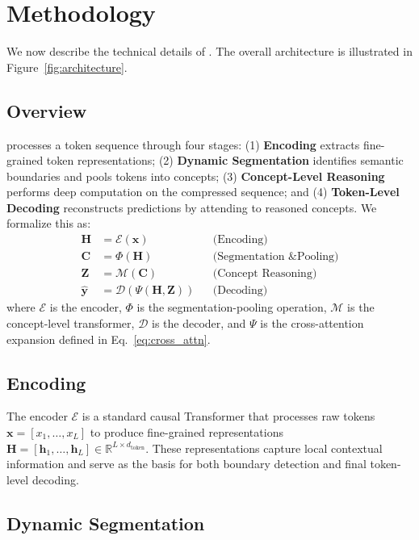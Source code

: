 \section{Methodology}

We now describe the technical details of \ModelName{}. The overall architecture is illustrated in Figure~\ref{fig:architecture}.

\subsection{Overview}

\ModelName{} processes a token sequence through four stages: (1) \textbf{Encoding} extracts fine-grained token representations; (2) \textbf{Dynamic Segmentation} identifies semantic boundaries and pools tokens into concepts; (3) \textbf{Concept-Level Reasoning} performs deep computation on the compressed sequence; and (4) \textbf{Token-Level Decoding} reconstructs predictions by attending to reasoned concepts. We formalize this as:
\begin{align}
    \mathbf{H} &= \mathcal{E}(\mathbf{x}) && \text{(Encoding)} \\
    \mathbf{C} &= \Phi(\mathbf{H}) && \text{(Segmentation \& Pooling)} \\
    \mathbf{Z} &= \mathcal{M}(\mathbf{C}) && \text{(Concept Reasoning)} \\
    \hat{\mathbf{y}} &= \mathcal{D}(\Psi(\mathbf{H}, \mathbf{Z})) && \text{(Decoding)}
\end{align}
where $\mathcal{E}$ is the encoder, $\Phi$ is the segmentation-pooling operation, $\mathcal{M}$ is the concept-level transformer, $\mathcal{D}$ is the decoder, and $\Psi$ is the cross-attention expansion defined in Eq.~\ref{eq:cross_attn}.

\subsection{Encoding}

The encoder $\mathcal{E}$ is a standard causal Transformer that processes raw tokens $\mathbf{x} = [x_1, \dots, x_L]$ to produce fine-grained representations $\mathbf{H} = [\mathbf{h}_1, \dots, \mathbf{h}_L] \in \mathbb{R}^{L \times d_{\text{token}}}$. These representations capture local contextual information and serve as the basis for both boundary detection and final token-level decoding.

\subsection{Dynamic Segmentation}

